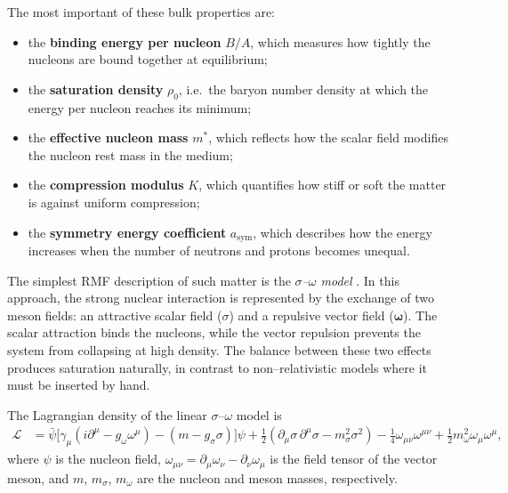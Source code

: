 The most important of these bulk properties are:
\begin{itemize}
  \item the \textbf{binding energy per nucleon} $B/A$, which measures how tightly the
        nucleons are bound together at equilibrium;
  \item the \textbf{saturation density} $\rho_{0}$, i.e.\ the baryon number density at which
        the energy per nucleon reaches its minimum;
  \item the \textbf{effective nucleon mass} $m^{*}$, which reflects how the scalar field
        modifies the nucleon rest mass in the medium;
  \item the \textbf{compression modulus} $K$, which quantifies how stiff or soft the
        matter is against uniform compression;
  \item the \textbf{symmetry energy coefficient} $a_{\mathrm{sym}}$, which describes how
        the energy increases when the number of neutrons and protons becomes unequal.
\end{itemize}

The simplest RMF description of such matter is the
\emph{$\sigma$–$\omega$ model} \cite{glendenning2000,pogliano2017}.
In this approach, the strong nuclear interaction is
represented by the exchange of two meson fields: an attractive scalar field
($\sigma$) and a repulsive vector field ($\boldsymbol{\omega}$). The scalar attraction binds the
nucleons, while the vector repulsion prevents the system from collapsing at high
density. The balance between these two effects produces saturation naturally, in
contrast to non–relativistic models where it must be inserted by hand.

The Lagrangian density of the linear $\sigma$–$\omega$ model is
\begin{align}
\mathcal{L}
&= \bar{\psi}\bigl[\gamma_{\mu}(i\partial^{\mu} - g_{\omega}\omega^{\mu})
      - (m - g_{\sigma}\sigma)\bigr]\psi
   + \tfrac{1}{2}(\partial_{\mu}\sigma\,\partial^{\mu}\sigma - m_{\sigma}^{2}\sigma^{2})
   - \tfrac{1}{4}\omega_{\mu\nu}\omega^{\mu\nu}
   + \tfrac{1}{2}m_{\omega}^{2}\omega_{\mu}\omega^{\mu},
\label{eq:lagrangian_sigmaomega}
\end{align}
where $\psi$ is the nucleon field, $\omega_{\mu\nu}=\partial_{\mu}\omega_{\nu}-\partial_{\nu}\omega_{\mu}$
is the field tensor of the vector meson, and $m$, $m_{\sigma}$, $m_{\omega}$ are the
nucleon and meson masses, respectively.

